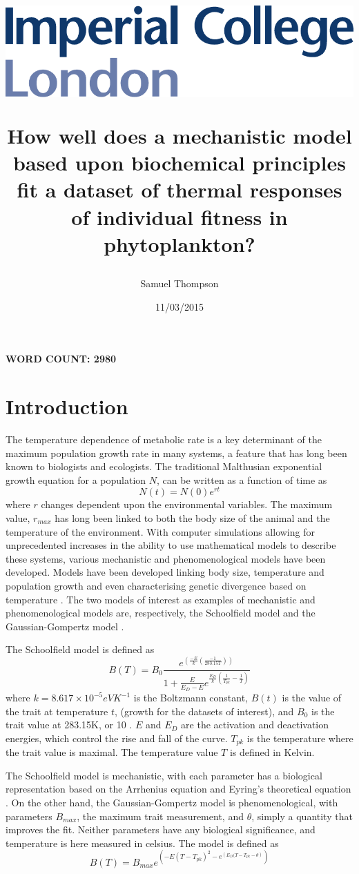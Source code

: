 \documentclass[11pt]{article}
\title{
\begin{flushright}
\includegraphics[scale = 0.4]{Imperial_Color2.pdf}
\end{flushright}
\textbf{How well does a mechanistic model based upon biochemical principles fit a dataset of thermal responses of individual fitness in phytoplankton?}
}
\author{Samuel Thompson}
\date{11/03/2015}
\begin{document}
\maketitle
\linenumbers
\textbf{WORD COUNT: 2980}
\section{Introduction}
The temperature dependence of metabolic rate is a key determinant of the maximum population growth rate in many systems, a feature that has long been known to biologists and ecologists. The traditional Malthusian exponential growth equation for a population \(N\), can be written as a function of time as
\begin{equation}
	N(t) = N(0)e^{rt}
\end{equation}
where \(r\) changes dependent upon the environmental variables. The maximum value, \(r_{max}\) has long been linked to both the body size of the animal and the temperature of the environment. With computer simulations allowing for unprecedented increases in the ability to use mathematical models to describe these systems, various mechanistic and phenomenological models have been developed. Models have been developed linking body size, temperature and population growth \citep{Savage2004a,Chen2010a} and even characterising genetic divergence based on temperature \citep{Allen2006a} . The two models of interest as examples of mechanistic and phenomenological models are, respectively, the Schoolfield model \citep{Schoolfield1981a} and the Gaussian-Gompertz model \citep{Martin2008a}.

The Schoolfield model is defined as 
\begin{equation}
	B(T) = B_0 \frac{\displaystyle {e^{\left(\displaystyle \frac {-E}{k}\left(\frac{-1}{283.15T}\right)\right)}}}{\displaystyle 1+\frac {E}{E_D-E}e^{\displaystyle \frac{E_D}{k}\left(\frac{1}{T_{pk}} - \frac{1}{T}\right)}}
\end{equation}
where \(k = 8.617 \times 10^{-5} eVK^{-1}\) is the Boltzmann constant, \(B(t)\) is the value of the trait at temperature \(t\), (growth for the datasets of interest), and \(B_0\) is the trait value at 283.15K, or 10 \celsius. \(E\) and \(E_D\) are the activation and deactivation energies, which control the rise and fall of the curve. \(T_{pk}\) is the temperature where the trait value is maximal. The temperature value \(T\) is defined in Kelvin.

The Schoolfield model is mechanistic, with each parameter has a biological representation based on the Arrhenius equation and Eyring's theoretical equation \citep{Schoolfield1981a}. On the other hand, the Gaussian-Gompertz model is phenomenological, with parameters \(B_{max}\), the maximum trait measurement, and \(\theta\), simply a quantity that improves the fit. Neither parameters have any biological significance, and temperature is here measured in celsius. The model is defined as
\begin{equation}
	B(T) = B_{max}e^{\displaystyle\left( -E(T-T_{pk})^2-e^{\displaystyle \left( E_D(T-T_{pk}-\theta \right)}\right)}
\end{equation}
\end{document}
